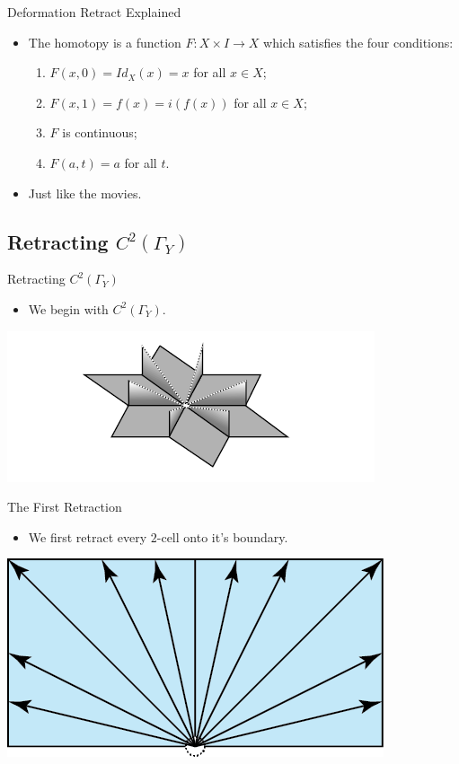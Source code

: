\documentclass{beamer}
\newcommand{\Y}{\Gamma_Y}
\newcommand{\C}{$C^2(\Y)$}
\begin{document}
\begin{frame}{Deformation Retract Explained}
\begin{itemize}
\item The homotopy is a function $F:X \times I \to X$ which satisfies the four conditions:
\begin{enumerate}
\item $F(x,0)=Id_X(x)=x$ for all $x \in X$;

\item $F(x,1)=f(x)=i(f(x))$ for all $x\in X$;

\item $F$ is continuous;
\item $F(a,t)=a$ for all $t$.
\end{enumerate}\pause

\item Just like the movies.
\end{itemize}
\end{frame}

\subsection{Retracting \C}

\begin{frame}{Retracting \C}
\begin{itemize}
\item We begin with \C.\pause
\end{itemize}
\centering
\includegraphics[scale=.75]{Config.jpg}
\end{frame}

\begin{frame}{The First Retraction}
\begin{itemize}
\item We first retract every $2$-cell onto it's boundary.\pause
\end{itemize}

\centering
\includegraphics[scale=1]{Thesis/Twins.png}
\end{frame}
\end{document}
